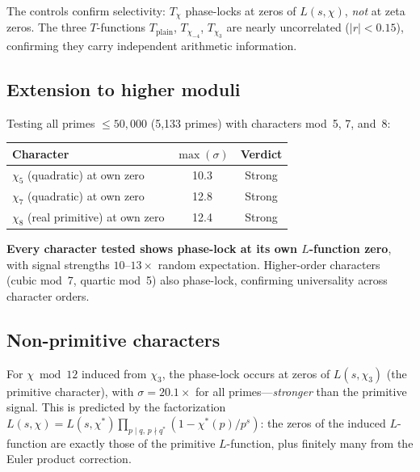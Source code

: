 \documentclass[11pt]{article}
\theoremstyle{definition}
\begin{document}
The controls confirm selectivity: $T_\chi$ phase-locks at zeros of
$L(s,\chi)$, \emph{not} at zeta zeros.  The three $T$-functions
$T_{\mathrm{plain}}$, $T_{\chi_{-4}}$, $T_{\chi_3}$ are nearly
uncorrelated ($|r| < 0.15$), confirming they carry independent
arithmetic information.


\subsection{Extension to higher moduli}

Testing all primes $\le 50{,}000$ (5{,}133 primes) with characters
mod~5, 7, and~8:

\begin{center}
\begin{tabular}{lcc}
\toprule
Character & $\max(\sigma)$ & Verdict \\
\midrule
$\chi_5$ (quadratic) at own zero & 10.3 & Strong \\
$\chi_7$ (quadratic) at own zero & 12.8 & Strong \\
$\chi_8$ (real primitive) at own zero & 12.4 & Strong \\
\bottomrule
\end{tabular}
\end{center}

\textbf{Every character tested shows phase-lock at its own
$L$-function zero}, with signal strengths $10$--$13\times$ random
expectation.  Higher-order characters (cubic mod~7, quartic mod~5)
also phase-lock, confirming universality across character orders.

\subsection{Non-primitive characters}

For $\chi \bmod 12$ induced from $\chi_3$, the phase-lock occurs at
zeros of $L(s, \chi_3)$ (the primitive character), with
$\sigma = 20.1\times$ for all primes---\emph{stronger} than the
primitive signal.  This is predicted by the factorization
$L(s, \chi) = L(s, \chi^*) \prod_{p \mid q,\, p \nmid q^*}
(1 - \chi^*(p)/p^s)$: the zeros of the induced $L$-function are
exactly those of the primitive $L$-function, plus finitely many from
the Euler product correction.
\end{document}
